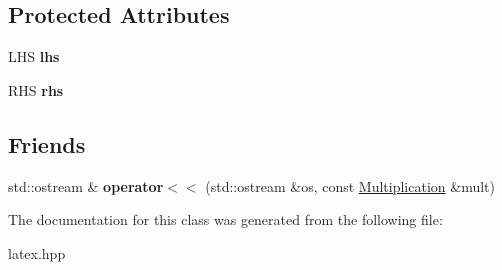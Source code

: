 \subsection*{Protected Attributes}
\begin{DoxyCompactItemize}
\item 
\hypertarget{classlatex_1_1math_1_1Multiplication_a4023853877f13a570cb9b576f92fa5ee}{L\-H\-S {\bfseries lhs}}\label{classlatex_1_1math_1_1Multiplication_a4023853877f13a570cb9b576f92fa5ee}

\item 
\hypertarget{classlatex_1_1math_1_1Multiplication_a032c65778b9166b745136e6b6349a064}{R\-H\-S {\bfseries rhs}}\label{classlatex_1_1math_1_1Multiplication_a032c65778b9166b745136e6b6349a064}

\end{DoxyCompactItemize}
\subsection*{Friends}
\begin{DoxyCompactItemize}
\item 
\hypertarget{classlatex_1_1math_1_1Multiplication_ad1e78a956a232d4eb730bd2fef03ea65}{std\-::ostream \& {\bfseries operator$<$$<$} (std\-::ostream \&os, const \hyperlink{classlatex_1_1math_1_1Multiplication}{Multiplication} \&mult)}\label{classlatex_1_1math_1_1Multiplication_ad1e78a956a232d4eb730bd2fef03ea65}

\end{DoxyCompactItemize}


The documentation for this class was generated from the following file\-:\begin{DoxyCompactItemize}
\item 
latex.\-hpp\end{DoxyCompactItemize}
